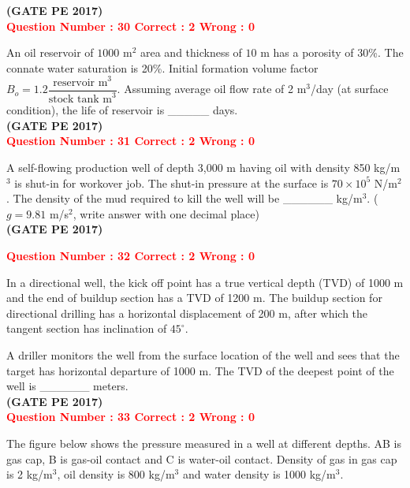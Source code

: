 \documentclass[journal,12pt,onecolumn]{article}
\begin{document}
{\hfill\textbf{(GATE PE 2017)}\\[0.6cm]


\textcolor{red}{\textbf{Question Number : 30 \hfill Correct : 2  Wrong : 0}}

An oil reservoir of $1000$ m$^2$ area and thickness of $10$ m has a porosity of 30\%. The connate water saturation is 20\%. Initial formation volume factor $B_o = 1.2 \dfrac{\text{reservoir m}^3}{\text{stock tank m}^3}$. Assuming average oil flow rate of 2 m$^3$/day (at surface condition), the life of reservoir is \_\_\_\_\_ days.\\

\hfill\textbf{(GATE PE 2017)}\\[0.6cm]

\textcolor{red}{\textbf{Question Number : 31 \hfill Correct : 2  Wrong : 0}}

A self-flowing production well of depth 3,000 m having oil with density 850 kg/m$^3$ is shut-in for workover job. The shut-in pressure at the surface is $70 \times 10^5$ N/m$^2$. The density of the mud required to kill the well will be \_\_\_\_\_\_ kg/m$^3$. ($g = 9.81$ m/s$^2$, write answer with one decimal place)\\

\hfill\textbf{(GATE PE 2017)}\\[0.6cm]

\newpage

\textcolor{red}{\textbf{Question Number : 32 \hfill Correct : 2  Wrong : 0}}

In a directional well, the kick off point has a true vertical depth (TVD) of 1000 m and the end of buildup section has a TVD of 1200 m. The buildup section for directional drilling has a horizontal displacement of 200 m, after which the tangent section has inclination of $45^\circ$.

A driller monitors the well from the surface location of the well and sees that the target has horizontal departure of 1000 m. The TVD of the deepest point of the well is \_\_\_\_\_\_ meters.\\

\hfill\textbf{(GATE PE 2017)}\\[0.6cm]

\textcolor{red}{\textbf{Question Number : 33 \hfill Correct : 2  Wrong : 0}}

The figure below shows the pressure measured in a well at different depths. AB is gas cap, B is gas-oil contact and C is water-oil contact. Density of gas in gas cap is 2 kg/m$^3$, oil density is 800 kg/m$^3$ and water density is 1000 kg/m$^3$.

}
\end{document}
